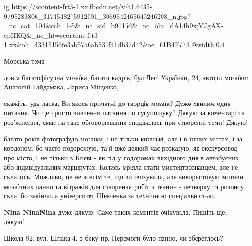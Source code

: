  
 
 
 
 

\ifcmt
  ig https://scontent-frt3-1.xx.fbcdn.net/v/t1.6435-9/95283806_3174548275912091_3069542465649246208_n.jpg?_nc_cat=104&ccb=1-5&_nc_sid=b9115d&_nc_ohc=dA14h9xjVJgAX-epHKQ&_nc_ht=scontent-frt3-1.xx&oh=d3315156fe3ab57a6ab531f41db37d42&oe=61B4F774
  @width 0.4
\fi

Морська тема


довга багатофігурна мозаїка, багато кадрів, бул Лесі Українки, 24, автори
мозаїки: Анатолій Гайдамака, Лариса Міщенко,


скажіть, удь ласка, Ви якось причетні до творців мозаїк? Дуже хвилює одне
питання. Чи це просто вивчення питання по гугупошуку? Дякую за коментарі та
роз'яснення, смае на таке обговорювання сподівалась при створенні теми! Дякую!


багато років фотографую мозаїки, і не тільки київські, але і в інших містах, і
за кордоном, бо часто подорожую, та й вже деякий час розказую, як екскурсовод
про місто, і не тільки в Києві - як гід у подорожах вихідного дня в автобусних
або індивідуальних маршрутах. Колись мріяла стати мистецтвознавцем, але не
склалось. Можливо, це не зовсім те, що ви очікували, але використовую мотиви
мозаїчних панно та вітражів для створення робіт з тканин - печворку та розпису
скла, бо закінчила університет Шевченка за технічною спеціальністью.

\textbf{Nina NinaNina} дуже дякую! Саме таких коментів очікувала. Пишіть ще, дякую!

Школа 82, вул. Шпака 4, з боку пр. Перемоги було панно, чи збереглось?
